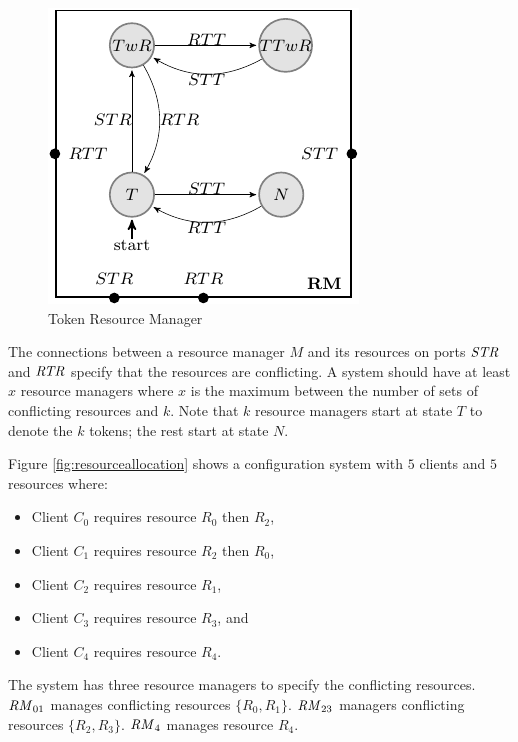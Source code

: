 \begin{figure}[H]
\begin{center}
\includegraphics[scale=1.2]{compiledfigures/token-crop.pdf}
\caption{Token Resource Manager}
\label{fig:conflict-token}
\end{center}
\end{figure}

The connections between a resource manager $M$ and its resources on ports $\mathit{STR}$ and $\mathit{RTR}$ specify that the 
resources are conflicting. 
A system should have at least $x$ resource managers where $x$ is the maximum between the number of sets of conflicting resources 
and $k$.
Note that $k$ resource managers start at state $T$ to denote the $k$ tokens; the rest start at state $N$. 

Figure \ref{fig:resourceallocation} shows a configuration system with $5$ clients and $5$ resources where:
\begin{itemize}
  \item Client $C_0$ requires resource $R_0$ then $R_2$,
  \item Client $C_1$ requires resource $R_2$ then $R_0$,
  \item Client $C_2$ requires resource $R_1$,
  \item Client $C_3$ requires resource $R_3$, and
  \item Client $C_4$ requires resource $R_4$.
\end{itemize}

The system has three resource managers to specify the conflicting resources. 
$\mathit{RM}_{01}$ manages conflicting resources $\{R_0,R_1\}$. 
$\mathit{RM}_{23}$ managers conflicting resources $\{R_2,R_3\}$.
$\mathit{RM}_{4}$ manages resource $R_4$. 

